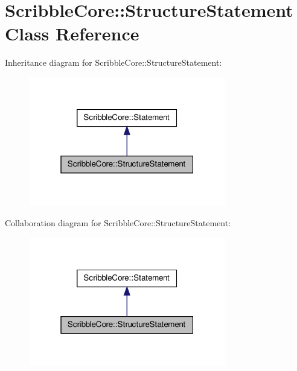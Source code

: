 \hypertarget{class_scribble_core_1_1_structure_statement}{\section{Scribble\-Core\-:\-:Structure\-Statement Class Reference}
\label{class_scribble_core_1_1_structure_statement}
}


Inheritance diagram for Scribble\-Core\-:\-:Structure\-Statement\-:
\nopagebreak
\begin{figure}[H]
\begin{center}
\leavevmode
\includegraphics[width=244pt]{class_scribble_core_1_1_structure_statement__inherit__graph}
\end{center}
\end{figure}


Collaboration diagram for Scribble\-Core\-:\-:Structure\-Statement\-:
\nopagebreak
\begin{figure}[H]
\begin{center}
\leavevmode
\includegraphics[width=244pt]{class_scribble_core_1_1_structure_statement__coll__graph}
\end{center}
\end{figure}
